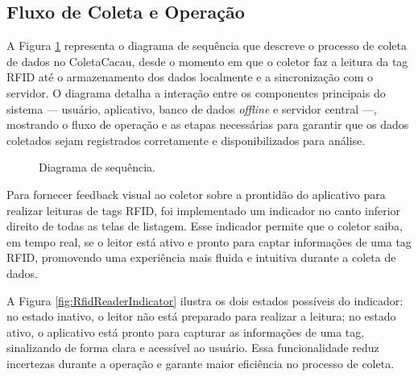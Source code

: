 \subsection{Fluxo de Coleta e Operação}
A Figura \ref{fig:SequenceDiagram} representa o diagrama de sequência que descreve o processo de coleta de dados no ColetaCacau, desde o momento em que o coletor faz a leitura da tag RFID até o armazenamento dos dados localmente e a sincronização com o servidor. O diagrama detalha a interação entre os componentes principais do sistema — usuário, aplicativo, banco de dados \textit{offline} e servidor central —, mostrando o fluxo de operação e as etapas necessárias para garantir que os dados coletados sejam registrados corretamente e disponibilizados para análise.

\begin{figure}[htb]
 \centering
 \caption{Diagrama de sequência.}
 \label{fig:SequenceDiagram}
\end{figure}

Para fornecer feedback visual ao coletor sobre a prontidão do aplicativo para realizar leituras de tags RFID, foi implementado um indicador no canto inferior direito de todas as telas de listagem. Esse indicador permite que o coletor saiba, em tempo real, se o leitor está ativo e pronto para captar informações de uma tag RFID, promovendo uma experiência mais fluida e intuitiva durante a coleta de dados.

A Figura \ref{fig:RfidReaderIndicator} ilustra os dois estados possíveis do indicador: no estado inativo, o leitor não está preparado para realizar a leitura; no estado ativo, o aplicativo está pronto para capturar as informações de uma tag, sinalizando de forma clara e acessível ao usuário. Essa funcionalidade reduz incertezas durante a operação e garante maior eficiência no processo de coleta.

